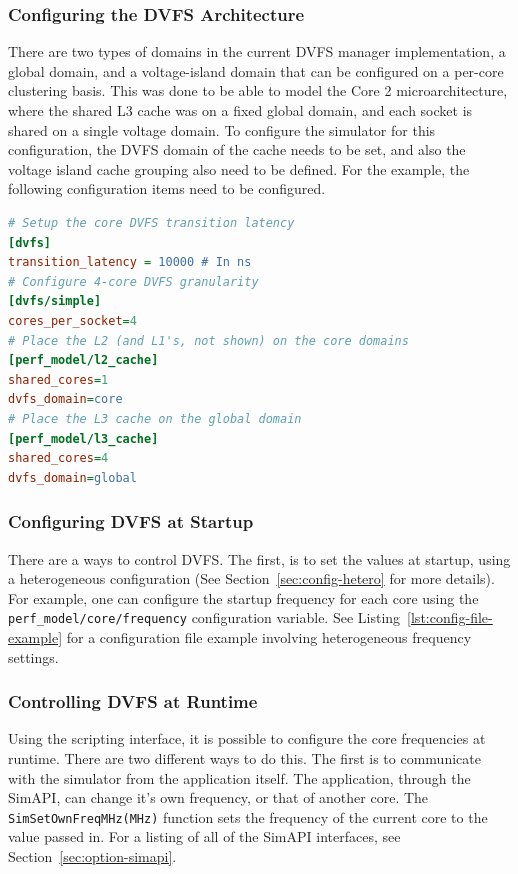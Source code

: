 \documentclass[a4paper,11pt,titlepage]{article}
\newcommand{\sourcecode}[1]{{\tt #1}}
\begin{document}
\subsubsection{Configuring the DVFS Architecture}

There are two types of domains in the current DVFS manager implementation, a global domain, and a
voltage-island domain that can be configured on a per-core clustering basis.  This was done to be able
to model the Core 2 microarchitecture, where the shared L3 cache was on a fixed global domain, and each socket
is shared on a single voltage domain.  To configure the simulator for this configuration, the DVFS domain
of the cache needs to be set, and also the voltage island cache grouping also need to be defined.  For the example,
the following configuration items need to be configured.

\begin{lstlisting}[label=lst:config-dvfs,caption=DVFS Cache Configuration for Core2,rulecolor=\color{DarkSlateBlue},language=ini]
# Setup the core DVFS transition latency
[dvfs]
transition_latency = 10000 # In ns
# Configure 4-core DVFS granularity
[dvfs/simple]
cores_per_socket=4
# Place the L2 (and L1's, not shown) on the core domains
[perf_model/l2_cache]
shared_cores=1
dvfs_domain=core
# Place the L3 cache on the global domain
[perf_model/l3_cache]
shared_cores=4
dvfs_domain=global
\end{lstlisting}

\subsubsection{Configuring DVFS at Startup}

There are a ways to control DVFS.  The first, is to set the values at startup, using a heterogeneous configuration (See Section~\ref{sec:config-hetero} for more details).  For example, one can configure the startup frequency
for each core using the \sourcecode{perf\_model/core/frequency} configuration variable.  See
Listing~\ref{lst:config-file-example} for a configuration file example involving heterogeneous frequency settings.

\subsubsection{Controlling DVFS at Runtime}

Using the scripting interface, it is possible to configure the core frequencies at runtime.
There are two different ways to do this.  The
first is to communicate with the simulator from the application itself.  The application, through the SimAPI, can
change it's own frequency, or that of another core.  The \sourcecode{SimSetOwnFreqMHz(MHz)} function sets the
frequency of the current core to the value passed in.  For a listing of all of the SimAPI interfaces,
see Section~\ref{sec:option-simapi}.
\end{document}
